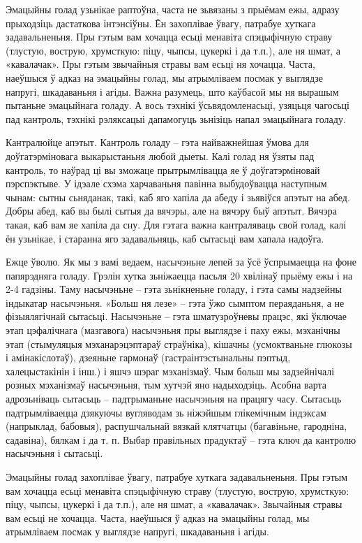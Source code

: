 Эмацыйны голад узьнікае раптоўна, часта не зьвязаны з прыёмам ежы, адразу прыходзіць дастаткова інтэнсіўны.
Ён захоплівае ўвагу, патрабуе хуткага задавальненьня. Пры гэтым вам хочацца есьці менавіта спэцыфічную страву (тлустую, вострую, хрумсткую: піцу, чыпсы, цукеркі і да т.п.), але ня шмат, а «кавалачак». Пры гэтым звычайныя стравы вам есьці ня хочацца. Часта, наеўшыся ў адказ на эмацыйны голад, мы атрымліваем посмак у выглядзе напругі, шкадаваньня і агіды. Важна разумець, што каўбасой мы ня вырашым пытаньне эмацыйнага голаду. А вось тэхнікі ўсьвядомленасьці, узяцьця чагосьці пад кантроль, тэхнікі рэляксацыі дапамогуць зьнізіць напал эмацыйнага голаду.

Кантралюйце апэтыт.
Кантроль голаду – гэта найважнейшая ўмова для доўгатэрміновага выкарыстаньня любой дыеты. Калі голад ня ўзяты пад кантроль, то наўрад ці вы зможаце прытрымлівацца яе ў доўгатэрміновай пэрспэктыве. У ідэале схэма харчаваньня павінна выбудоўвацца наступным чынам: сытны сьняданак, такі, каб яго хапіла да абеду і зьявіўся апэтыт на абед. Добры абед, каб вы былі сытыя да вячэры, але на вячэру быў апэтыт. Вячэра такая, каб вам яе хапіла да сну. Для гэтага важна кантраляваць свой голад, калі ён узьнікае, і старанна яго задавальняць, каб сытасьці вам хапала надоўга.

Ежце ўволю.
Як мы з вамі ведаем, насычэньне лепей за ўсё ўспрымаецца на фоне папярэдняга голаду. Грэлін хутка зьніжаецца пасьля 20 хвілінаў прыёму ежы і на 2-4 гадзіны. Таму насычэньне – гэта зьнікненьне голаду, і гэта самы надзейны індыкатар насычэньня. «Больш ня лезе» – гэта ўжо сымптом пераяданьня, а не фізыялягічнай сытасьці. Насычэньне – гэта шматузроўневы працэс, які ўключае этап цэфалічнага (мазгавога) насычэньня пры выглядзе і паху ежы, мэханічны этап (стымуляцыя мэханарэцэптараў страўніка), кішачны (усмоктваньне глюкозы і амінакіслотаў), дзеяньне гармонаў (гастраінтэстынальны пэптыд, халецыстакінін і інш.) і яшчэ шэраг мэханізмаў. Чым больш мы задзейнічалі розных мэханізмаў насычэньня, тым хутчэй яно надыходзіць. Асобна варта адрозьніваць сытасьць – падтрыманьне насычэньня на працягу часу. Сытасьць падтрымліваецца дзякуючы вугляводам зь ніжэйшым глікемічным індэксам (напрыклад, бабовыя), распушчальнай вязкай клятчатцы (багавіньне, гародніна, садавіна), бялкам і да т. п. Выбар правільных прадуктаў – гэта ключ да кантролю насычэньня і сытасьці.

Эмацыйны голад захоплівае ўвагу, патрабуе хуткага задавальненьня. Пры гэтым вам хочацца есьці менавіта спэцыфічную страву (тлустую, вострую, хрумсткую: піцу, чыпсы, цукеркі і да т.п.), але ня шмат, а «кавалачак». Звычайныя стравы вам есьці не хочацца. Часта, наеўшыся ў адказ на эмацыйны голад, мы атрымліваем посмак у выглядзе напругі, шкадаваньня і агіды.

